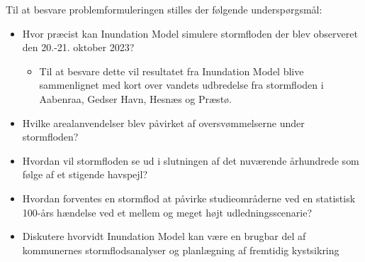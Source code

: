 Til at besvare problemformuleringen stilles der følgende underspørgsmål:
\begin{itemize}
    \setlength{\itemsep}{0pt}
    \setlength{\parskip}{0pt}
    \setlength{\parsep}{0pt}
    \item Hvor præcist kan Inundation Model simulere stormfloden der blev observeret den 20.-21. oktober 2023?
    \begin{itemize}
        \item Til at besvare dette vil resultatet fra Inundation Model blive sammenlignet med kort over vandets udbredelse fra stormfloden i Aabenraa, Gedser Havn, Hesnæs og Præstø.
    \end{itemize}
    \item Hvilke arealanvendelser blev påvirket af oversvømmelserne under stormfloden?
    \item Hvordan vil stormfloden se ud i slutningen af det nuværende århundrede som følge af et stigende havspejl?
    \item Hvordan forventes en stormflod at påvirke studieområderne ved en statistisk 100-års hændelse ved et mellem og meget højt udledningsscenarie?
    \item Diskutere hvorvidt Inundation Model kan være en brugbar del af kommunernes stormflodsanalyser og planlægning af fremtidig kystsikring
\end{itemize}